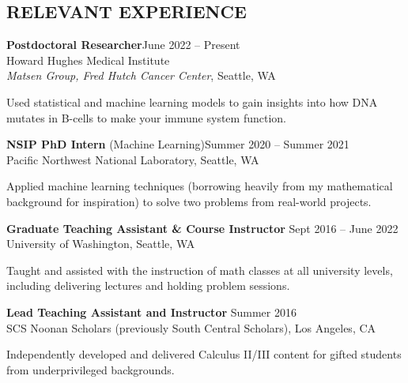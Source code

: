 \documentclass[margin]{res} %
\begin{document}
\begin{resume}

    \vspace{-2.5ex}
    \section{RELEVANT EXPERIENCE}

     {\bf Postdoctoral Researcher}\hfill June 2022 -- Present\\
    Howard Hughes Medical Institute\\
    \textit{Matsen Group, Fred Hutch Cancer Center}, Seattle, WA

    \vspace{-0.1in}Used statistical and machine learning models to gain insights into how DNA mutates in B-cells to make your immune system function.

    \textbf{NSIP PhD Intern} (Machine Learning)\hfill Summer 2020 -- Summer 2021\\
    Pacific Northwest National Laboratory, Seattle, WA

    \vspace{-0.1in}Applied machine learning techniques (borrowing heavily from my mathematical background for inspiration) to solve two problems from real-world projects.

        {\bf Graduate Teaching Assistant \& Course Instructor} \hfill Sept 2016 -- June 2022 \\
    University of Washington, Seattle, WA

    \vspace{-0.1in}Taught and assisted with the instruction of math classes at all university levels, including delivering lectures and holding problem sessions.

        {\bf Lead Teaching Assistant and Instructor} \hfill Summer 2016 \\
    SCS Noonan Scholars (previously South Central Scholars), Los Angeles, CA

    \vspace{-0.1in}Independently developed and delivered Calculus II/III content for gifted students from underprivileged backgrounds.


\end{resume}
\end{document}
